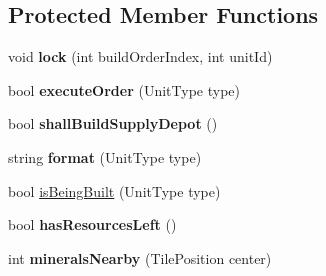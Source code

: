 \subsection*{Protected Member Functions}
\begin{DoxyCompactItemize}
\item 
\hypertarget{class_constructor_a3f33fd9dc72a965427ded2fa493606bb}{void {\bfseries lock} (int build\-Order\-Index, int unit\-Id)}\label{class_constructor_a3f33fd9dc72a965427ded2fa493606bb}

\item 
\hypertarget{class_constructor_ac46794dbcb096c5d4fda0f8738a4e136}{bool {\bfseries execute\-Order} (Unit\-Type type)}\label{class_constructor_ac46794dbcb096c5d4fda0f8738a4e136}

\item 
\hypertarget{class_constructor_a9e2da0d2cfb6433f34d235e7a47c27d3}{bool {\bfseries shall\-Build\-Supply\-Depot} ()}\label{class_constructor_a9e2da0d2cfb6433f34d235e7a47c27d3}

\item 
\hypertarget{class_constructor_a67ff7f5ee806591e533570518f9fe1b0}{string {\bfseries format} (Unit\-Type type)}\label{class_constructor_a67ff7f5ee806591e533570518f9fe1b0}

\item 
bool \hyperlink{class_constructor_acc158b03429501fb10d0e394ceaf9639}{is\-Being\-Built} (Unit\-Type type)
\item 
\hypertarget{class_constructor_a07993b6e9e33a5fd0d63855898038a4e}{bool {\bfseries has\-Resources\-Left} ()}\label{class_constructor_a07993b6e9e33a5fd0d63855898038a4e}

\item 
\hypertarget{class_constructor_ae0927f71cbef5f040f5f6ae99e5af72b}{int {\bfseries minerals\-Nearby} (Tile\-Position center)}\label{class_constructor_ae0927f71cbef5f040f5f6ae99e5af72b}

\end{DoxyCompactItemize}
